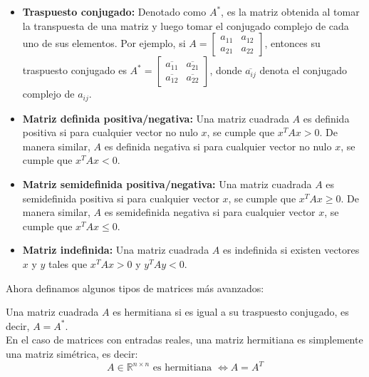 \begin{definición}
\begin{itemize}
        \item \textbf{Traspuesto conjugado:} Denotado como \( A^* \), es la matriz obtenida al tomar la transpuesta de una matriz y luego tomar el conjugado complejo de cada uno de sus elementos. Por ejemplo, si \( A = \begin{bmatrix} a_{11} & a_{12} \\ a_{21} & a_{22} \end{bmatrix} \), entonces su traspuesto conjugado es \( A^* = \begin{bmatrix} \overline{a_{11}} & \overline{a_{21}} \\ \overline{a_{12}} & \overline{a_{22}} \end{bmatrix} \), donde \( \overline{a_{ij}} \) denota el conjugado complejo de \( a_{ij} \).
        \item \textbf{Matriz definida positiva/negativa:} Una matriz cuadrada \( A \) es definida positiva si para cualquier vector no nulo \( x \), se cumple que \( x^T A x > 0 \). De manera similar, \( A \) es definida negativa si para cualquier vector no nulo \( x \), se cumple que \( x^T A x < 0 \).
        \item \textbf{Matriz semidefinida positiva/negativa:} Una matriz cuadrada \( A \) es semidefinida positiva si para cualquier vector \( x \), se cumple que \( x^T A x \geq 0 \). De manera similar, \( A \) es semidefinida negativa si para cualquier vector \( x \), se cumple que \( x^T A x \leq 0 \).
        \item \textbf{Matriz indefinida:} Una matriz cuadrada \( A \) es indefinida si existen vectores \( x \) y \( y \) tales que \( x^T A x > 0 \) y \( y^T A y < 0 \).
    \end{itemize}
\end{definición}

Ahora definamos algunos tipos de matrices más avanzados:
\begin{definición}
    Una matriz cuadrada \( A \) es hermitiana si es igual a su traspuesto conjugado, es decir, \( A = A^* \).\\
    En el caso de matrices con entradas reales, una matriz hermitiana es simplemente una matriz simétrica, es decir:
    \[
        A \in \mathbb{R}^{n \times n} \text{ es hermitiana } \iff A = A^T
    \]
\end{definición}

